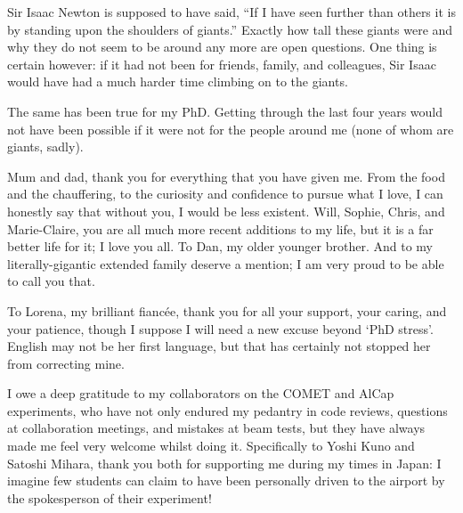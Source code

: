 \begin{acknowledgements}
Sir Isaac Newton is supposed to have said, ``If I have seen further than others it is by standing upon the shoulders of giants.''  
Exactly how tall these giants were and why they do not seem to be around any more are open questions.
One thing is certain however: if it had not been for friends, family, and colleagues, Sir Isaac would have had a much harder time climbing on to the giants.

The same has been true for my PhD.
Getting through the last four years would not have been possible if it were not for the people around me (none of whom are giants, sadly).

Mum and dad, thank you for everything that you have given me. From the food and the chauffering, to the curiosity and confidence to pursue what I love, 
I can honestly say that without you, I would be less existent.
Will, Sophie, Chris, and Marie-Claire, you are all much more recent additions to my life, but it is a far better life for it; I love you all.
To Dan, my older younger brother.
And to my literally-gigantic extended family deserve a mention; I am very proud to be able to call you that.

To Lorena, my brilliant fianc\'{e}e, thank you for all your support, your caring, and your patience, though I suppose I will need a new excuse beyond `PhD stress'.
English may not be her first language, but that has certainly not stopped her from correcting mine.

I owe a deep gratitude to my collaborators on the COMET and AlCap experiments, who have not only endured my pedantry in code reviews, questions at collaboration meetings, and mistakes at beam tests, but they have always made me feel very welcome whilst doing it. 
Specifically to Yoshi Kuno and Satoshi Mihara, thank you both for supporting me during my times in Japan:
I imagine few students can claim to have been personally driven to the airport by the spokesperson of their experiment!


\end{acknowledgements}
